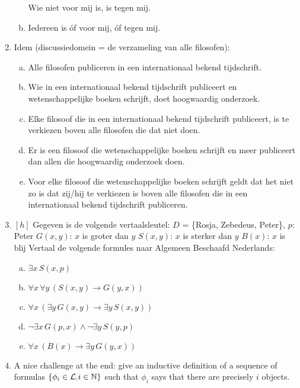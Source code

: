 \begin{enumerate}[\thesection.1]
\begin{enumerate}[a.]
 Wie niet voor mij is, is tegen mij.
\item
 Iedereen is \'of voor mij, \'of tegen mij.
\end{enumerate}
\item
Idem (discussiedomein = de verzameling van alle filosofen):
\begin{enumerate}[a.]
\item
 Alle filosofen publiceren in een internationaal bekend
tijdschrift.
\item
 Wie in een internationaal bekend tijdschrift publiceert en
wetenschappelijke boeken schrijft, doet hoogwaardig onderzoek.
\item
Elke filosoof die in een internationaal bekend tijdschrift
publiceert, is te verkiezen boven alle filosofen die dat niet doen.
\item
 Er is een filosoof die wetenschappelijke boeken schrijft en meer
publiceert dan allen die hoogwaardig onderzoek doen.
\item
 Voor elke filosoof die wetenschappelijke boeken schrijft geldt dat
het niet zo is dat zij/hij te verkiezen is boven alle filosofen die in
een internationaal bekend tijdschrift publiceren.
\end{enumerate}
\item $[h]$
 Gegeven is de volgende vertaalsleutel:\newline
$D$ = \{Rosja, Zebedeus, Peter\},\newline
$p$: Peter\newline
$G(x,y)$: $x$\/ is groter dan $y$\newline
$S(x,y)$: $x$\/ is sterker  dan $y$\newline
$B(x)$: $x$\/ is blij\newline
Vertaal de volgende formules naar Algemeen Beschaafd Nederlands:
\begin{enumerate}[a.]
\item
$ \exists  x\, S(x,p)$
\item
$ \forall  x\,  \forall y\, (S(x,y) \rightarrow G(y,x))$
\item
 $\forall x\, (  \exists y\, G(x,y) \rightarrow   \exists  y\, S(x,y))$
\item
 $ \lnot  \exists x\, G(p,x) \wedge   \lnot  \exists  y\, S(y,p)$
\item
 $\forall x \, (B(x) \rightarrow   \exists y\, G(y,x))$
\end{enumerate}

	\item A nice challenge at the end: give an inductive definition of a sequence of formulas $\{\phi_i\in\mathcal{L}_\empty:i\in \mathbb{N}\}$ such that $\phi_i$ says that there are precisely $i$ objects.
	
	\end{enumerate}

